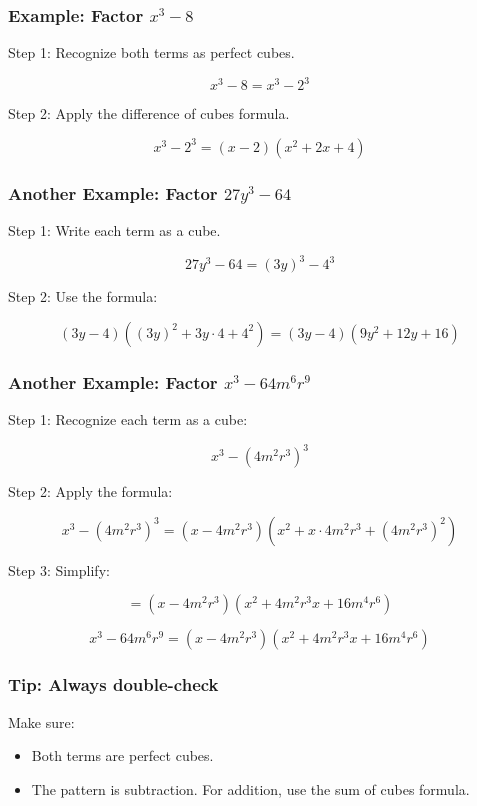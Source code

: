 \documentclass[11pt]{article}
\begin{document}
\subsubsection*{Example: Factor \( x^3 - 8 \)}

Step 1: Recognize both terms as perfect cubes.

\[
x^3 - 8 = x^3 - 2^3
\]

Step 2: Apply the difference of cubes formula.

\[
x^3 - 2^3 = (x - 2)(x^2 + 2x + 4)
\]

\subsubsection*{Another Example: Factor \( 27y^3 - 64 \)}

Step 1: Write each term as a cube.

\[
27y^3 - 64 = (3y)^3 - 4^3
\]

Step 2: Use the formula:

\[
(3y - 4)\left((3y)^2 + 3y \cdot 4 + 4^2\right) = (3y - 4)(9y^2 + 12y + 16)
\]

\subsubsection*{Another Example: Factor \( x^3 - 64m^6r^9 \)}

Step 1: Recognize each term as a cube:

\[
x^3 - (4m^2r^3)^3
\]

Step 2: Apply the formula:

\[
x^3 - (4m^2r^3)^3 = \left(x - 4m^2r^3\right)\left(x^2 + x \cdot 4m^2r^3 + (4m^2r^3)^2\right)
\]

Step 3: Simplify:

\[
= \left(x - 4m^2r^3\right)\left(x^2 + 4m^2r^3x + 16m^4r^6\right)
\]

\begin{tcolorbox}[colback=yellow!5!white, colframe=yellow!80!black, title=Final Answer]
\[
x^3 - 64m^6r^9 = \left(x - 4m^2r^3\right)\left(x^2 + 4m^2r^3x + 16m^4r^6\right)
\]
\end{tcolorbox}

\subsubsection*{Tip: Always double-check}
Make sure:
\begin{itemize}
  \item Both terms are perfect cubes.
  \item The pattern is subtraction. For addition, use the sum of cubes formula.
\end{itemize}
\end{document}
